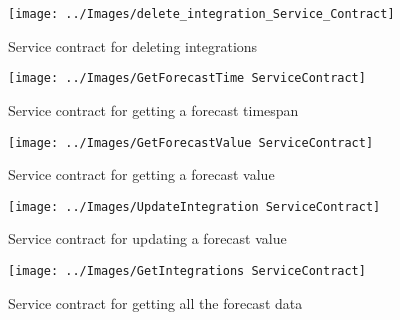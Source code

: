 \documentclass[11pt,a4paper]{article}
\begin{document}
\begin{figure}[h!]
	\texttt{[image: ../Images/delete\_integration\_Service\_Contract]}
	\caption{Service contract for deleting integrations}
\end{figure}

\begin{figure}[H]
	\texttt{[image: ../Images/GetForecastTime ServiceContract]}
	\caption{Service contract for getting a forecast timespan}
\end{figure}

\begin{figure}[H]
	\texttt{[image: ../Images/GetForecastValue ServiceContract]}
	\caption{Service contract for getting a forecast value}
\end{figure}

\begin{figure}[H]
	\texttt{[image: ../Images/UpdateIntegration ServiceContract]}
	\caption{Service contract for updating a forecast value}
\end{figure}

\begin{figure}[H]
	\texttt{[image: ../Images/GetIntegrations ServiceContract]}
	\caption{Service contract for getting all the forecast data}
\end{figure}
\end{document}
